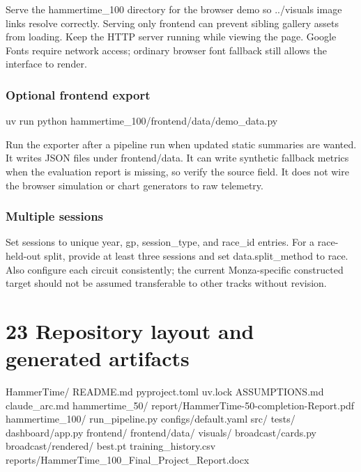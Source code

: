 \documentclass[11pt,a4paper,oneside]{report}
\begin{document}
Serve the hammertime\_100 directory for the browser demo so ../visuals image links resolve correctly. Serving only frontend can prevent sibling gallery assets from loading. Keep the HTTP server running while viewing the page. Google Fonts require network access; ordinary browser font fallback still allows the interface to render.

\subsection*{Optional frontend export}

uv run python hammertime\_100/frontend/data/demo\_data.py

Run the exporter after a pipeline run when updated static summaries are wanted. It writes JSON files under frontend/data. It can write synthetic fallback metrics when the evaluation report is missing, so verify the source field. It does not wire the browser simulation or chart generators to raw telemetry.

\subsection*{Multiple sessions}

Set sessions to unique year, gp, session\_type, and race\_id entries. For a race-held-out split, provide at least three sessions and set data.split\_method to race. Also configure each circuit consistently; the current Monza-specific constructed target should not be assumed transferable to other tracks without revision.

\clearpage

\clearpage\chapter*{23 Repository layout and generated artifacts}

HammerTime/  README.md  pyproject.toml  uv.lock  ASSUMPTIONS.md  claude\_arc.md  hammertime\_50/    report/HammerTime-50-completion-Report.pdf  hammertime\_100/    run\_pipeline.py    configs/default.yaml    src/  tests/    dashboard/app.py    frontend/  frontend/data/    visuals/    broadcast/cards.py  broadcast/rendered/    best.pt  training\_history.csv  reports/HammerTime\_100\_Final\_Project\_Report.docx

\end{document}
